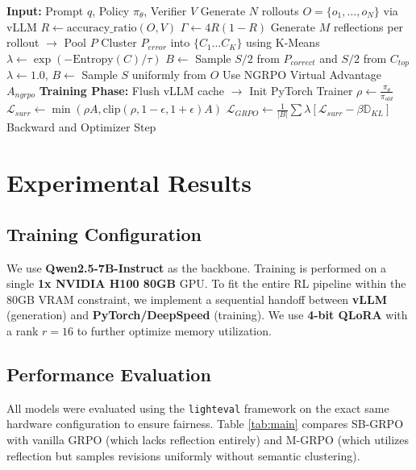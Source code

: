 \documentclass[runningheads]{llncs}
\begin{document}
\begin{algorithm}[H]
\caption{SB-GRPO Training Step}
\begin{algorithmic}[1]
\STATE \textbf{Input:} Prompt $q$, Policy $\pi_\theta$, Verifier $V$
\STATE Generate $N$ rollouts $O = \{o_1, \dots, o_N\}$ via vLLM
\STATE $R \gets \text{accuracy\_ratio}(O, V)$
\STATE $\Gamma \gets 4R(1-R)$
    \STATE Generate $M$ reflections per rollout $\to$ Pool $P$
    \STATE Cluster $P_{error}$ into $\{C_1 \dots C_K\}$ using K-Means
    \STATE $\lambda \gets \exp(-\text{Entropy}(C)/\tau)$
    \STATE $B \gets$ Sample $S/2$ from $P_{correct}$ and $S/2$ from $C_{top}$
\ELSE
    \STATE $\lambda \gets 1.0$, $B \gets$ Sample $S$ uniformly from $O$
    \STATE Use NGRPO Virtual Advantage $A_{ngrpo}$
\ENDIF
\STATE \textbf{Training Phase:}
\STATE Flush vLLM cache $\to$ Init PyTorch Trainer
\STATE $\rho \gets \frac{\pi_\theta}{\pi_{old}}$
\STATE $\mathcal{L}_{surr} \gets \min\left(\rho A, \text{clip}\left(\rho, 1-\epsilon, 1+\epsilon\right)A\right)$
\STATE $\mathcal{L}_{GRPO} \gets \frac{1}{|B|} \sum \lambda \left[ \mathcal{L}_{surr} - \beta \mathbb{D}_{KL} \right]$
\STATE Backward and Optimizer Step
\end{algorithmic}
\end{algorithm}

\section{Experimental Results}

\subsection{Training Configuration}
We use \textbf{Qwen2.5-7B-Instruct} as the backbone. Training is performed on a single \textbf{1x NVIDIA H100 80GB} GPU. To fit the entire RL pipeline within the 80GB VRAM constraint, we implement a sequential handoff between \textbf{vLLM} (generation) and \textbf{PyTorch/DeepSpeed} (training). We use \textbf{4-bit QLoRA} with a rank $r=16$ to further optimize memory utilization.

\subsection{Performance Evaluation}
All models were evaluated using the \texttt{lighteval} framework on the exact same hardware configuration to ensure fairness. Table \ref{tab:main} compares SB-GRPO with vanilla GRPO (which lacks reflection entirely) and M-GRPO (which utilizes reflection but samples revisions uniformly without semantic clustering).
\end{document}
